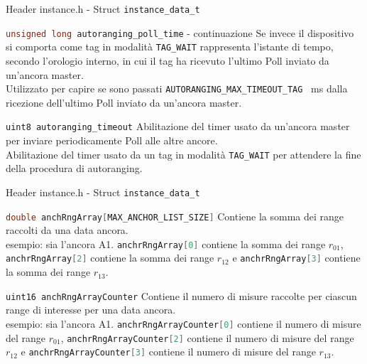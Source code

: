 \begin{frame}{Header instance.h - Struct \lstinline[language=C]!instance_data_t!}
  \begin{block}{\lstinline[language=C]!unsigned long autoranging_poll_time! - continuazione}
    Se invece il dispositivo si comporta come tag in modalità \lstinline[language=C]!TAG_WAIT! rappresenta l'istante di tempo, secondo l'orologio
    interno, in cui il tag ha ricevuto l'ultimo Poll inviato da un'ancora master.\\
    Utilizzato per capire se sono passati \lstinline[language=C]!AUTORANGING_MAX_TIMEOUT_TAG! \SI{}{\milli\second} dalla ricezione
    dell'ultimo Poll inviato da un'ancora master.
  \end{block}
  \begin{block}{\lstinline[language=C]!uint8 autoranging_timeout!}
    Abilitazione del timer usato da un'ancora master per inviare periodicamente Poll alle altre ancore.\\
    Abilitazione del timer usato da un tag in modalità \lstinline[language=C]!TAG_WAIT! per attendere la fine della
    procedura di autoranging.
  \end{block}
\end{frame}

\begin{frame}{Header instance.h - Struct \lstinline[language=C]!instance_data_t!}
  \begin{block}{\lstinline[language=C]!double anchRngArray[MAX_ANCHOR_LIST_SIZE]!}
    Contiene la somma dei range raccolti da una data ancora.\\
    \textcolor{dgreen}{esempio:} sia l'ancora A1. \lstinline[language=C]!anchrRngArray[0]! contiene la somma dei range $r_{01}$,
    \lstinline[language=C]!anchrRngArray[2]! contiene la somma dei range $r_{12}$ e \lstinline[language=C]!anchrRngArray[3]! contiene la somma dei range $r_{13}$.
  \end{block}
  \begin{block}{\lstinline[language=C]!uint16 anchRngArrayCounter!}
    Contiene il numero di misure raccolte per ciascun range di interesse per una data ancora.\\
    \textcolor{dgreen}{esempio:} sia l'ancora A1. \lstinline[language=C]!anchrRngArrayCounter[0]! contiene il numero di misure del range $r_{01}$,
    \lstinline[language=C]!anchrRngArrayCounter[2]! contiene il numero di misure del range $r_{12}$ e \lstinline[language=C]!anchrRngArrayCounter[3]! contiene il numero di misure del range $r_{13}$.
  \end{block}
\end{frame}

